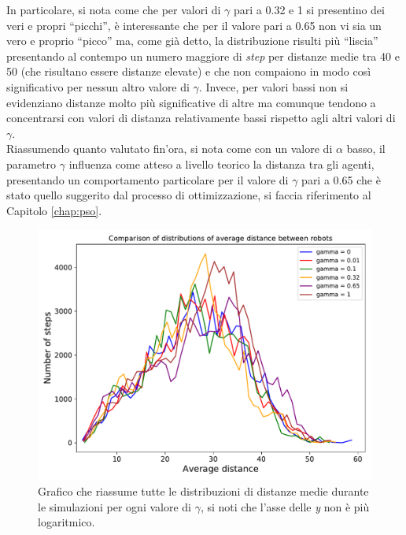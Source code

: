 In particolare, si nota come che per valori di $\gamma$ pari a 0.32 e 1 si presentino dei veri e propri “picchi”, è interessante che per il valore pari a 0.65 non vi sia un vero e proprio “picco” ma, come già detto, la distribuzione risulti più “liscia” presentando al contempo un numero maggiore di \textit{step} per distanze medie tra 40 e 50 (che risultano essere distanze elevate) e che non compaiono in modo così significativo per nessun altro valore di $\gamma$.
Invece, per valori bassi non si evidenziano distanze molto più significative di altre ma comunque tendono a concentrarsi con valori di distanza relativamente bassi rispetto agli altri valori di $\gamma$.\\
Riassumendo quanto valutato fin'ora, si nota come con un valore di $\alpha$ basso, il parametro $\gamma$ influenza come atteso a livello teorico la distanza tra gli agenti, presentando un comportamento particolare per il valore di $\gamma$ pari a 0.65 che è stato quello suggerito dal processo di ottimizzazione, si faccia riferimento al Capitolo \ref{chap:pso}.
\begin{figure}
	\centering
	\includegraphics[width=0.9\linewidth]{images/gamma_results/low_alpha/comparison}
	\caption{Grafico che riassume tutte le distribuzioni di distanze medie durante le simulazioni per ogni valore di $\gamma$, si noti che l'asse delle \textit{y} non è più logaritmico.}
	\label{fig:gammaComparison}
\end{figure}

